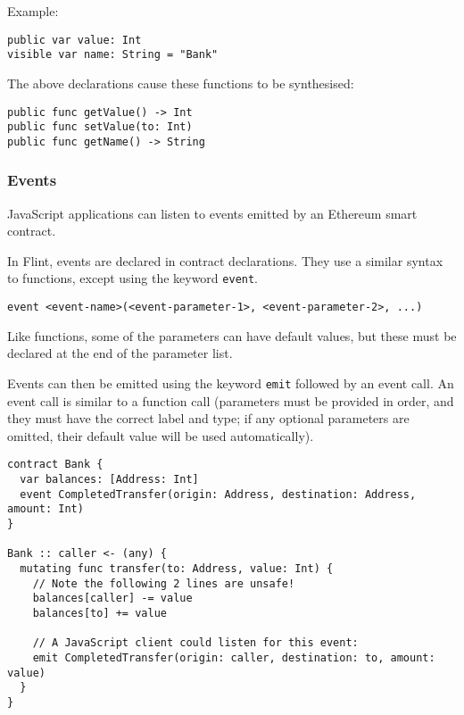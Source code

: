 Example:

\begin{verbatim}
public var value: Int
visible var name: String = "Bank"
\end{verbatim}

The above declarations cause these functions to be synthesised:

\begin{verbatim}
public func getValue() -> Int
public func setValue(to: Int)
public func getName() -> String
\end{verbatim}

\subsubsection{Events}
\label{sec:appendix-b-events}

JavaScript applications can listen to events emitted by an Ethereum smart contract.

In Flint, events are declared in contract declarations. They use a similar syntax to functions, except using the keyword \texttt{event}.

\begin{verbatim}
event <event-name>(<event-parameter-1>, <event-parameter-2>, ...)
\end{verbatim}

Like functions, some of the parameters can have default values, but these must be declared at the end of the parameter list.

Events can then be emitted using the keyword \texttt{emit} followed by an event call. An event call is similar to a function call (parameters must be provided in order, and they must have the correct label and type; if any optional parameters are omitted, their default value will be used automatically).

\begin{verbatim}
contract Bank {
  var balances: [Address: Int]
  event CompletedTransfer(origin: Address, destination: Address, amount: Int)
}

Bank :: caller <- (any) {
  mutating func transfer(to: Address, value: Int) {
    // Note the following 2 lines are unsafe!
    balances[caller] -= value
    balances[to] += value

    // A JavaScript client could listen for this event:
    emit CompletedTransfer(origin: caller, destination: to, amount: value)
  }
}
\end{verbatim}


